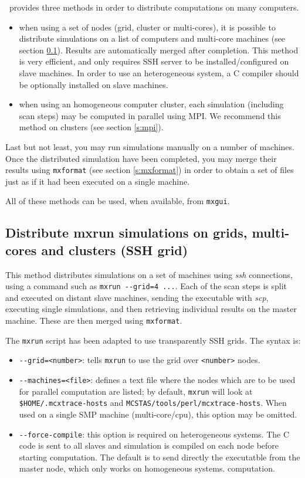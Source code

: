 \MCX\ provides three methods in order to distribute computations on many computers.
\begin{itemize}
\item when using a set of nodes (grid, cluster or multi-cores), it is possible to distribute simulations on a 
  list of computers and multi-core machines (see section \ref{s:ssh-grid}). Results are automatically 
  merged after completion. 
  This method is very efficient, and only requires SSH server to be installed/configured on slave machines. 
  In order to use an heterogeneous system, a C compiler should be optionally installed on slave machines.
\item when using an homogeneous computer cluster, each simulation (including scan
  steps) may be computed in parallel using MPI. We recommend this method on clusters (see section \ref{s:mpi}).
\end{itemize}

Last but not least, you may run simulations manually on a number of machines.
Once the distributed simulation have been completed, you may merge their results using \verb+mxformat+ (see section \ref{s:mxformat})  in order to obtain a set of files just as if it had been executed on a single machine.

All of these methods can be used, when available, from \texttt{mxgui}.

\subsection{Distribute mxrun simulations on grids, multi-cores and clusters (SSH grid)}
\label{s:ssh-grid}
  This method distributes simulations on a set of machines using \emph{ssh}
  connections, using a command such as \verb+mxrun --grid=4 ...+. 
  Each of the scan steps is split and executed on distant slave machines, sending the executable
  with \emph{scp}, executing single simulations, and then retrieving individual
  results on the master machine. These are then merged using \texttt{mxformat}. 
  
  The \verb'mxrun' script has been adapted to use transparently SSH grids. The syntax is:
\begin{itemize}
\item \verb'--grid=<number>': tells \verb'mxrun' to use the grid over \verb'<number>' nodes.
\item \verb'--machines=<file>': defines a text file where the
  nodes which are to be used for parallel computation are listed; by
  default, \verb'mxrun' will look at \verb'$HOME/.mcxtrace-hosts' and
  \verb'MCSTAS/tools/perl/mcxtrace-hosts'. When used on a single SMP machine 
  (multi-core/cpu), this option may be omitted.
\item \verb'--force-compile': this option is required on heterogeneous systems. 
  The C code is sent to all slaves and simulation is compiled on each node before 
  starting computation. The default is to send directly the executatble from the 
  master node, which only works on homogeneous systems.
  computation. 
\end{itemize}
  

